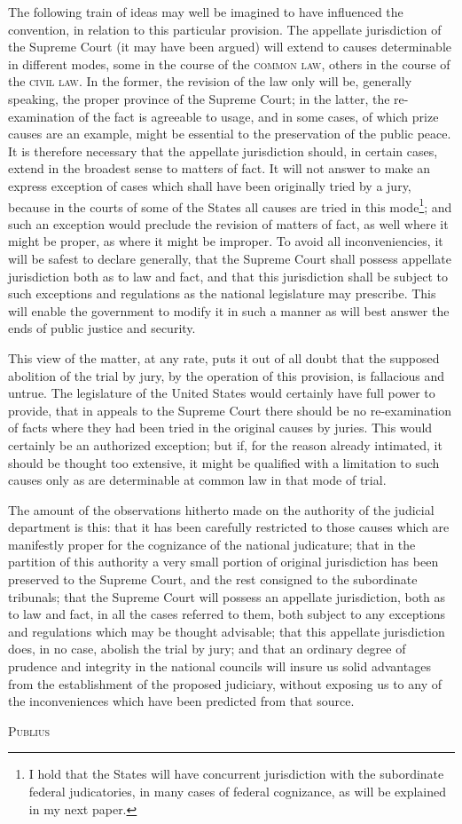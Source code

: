 The following train of ideas may well be imagined to have influenced the convention, in relation to this particular provision. The appellate jurisdiction of the Supreme Court (it may have been argued) will extend to causes determinable in different modes, some in the course of the \textsc{common law}, others in the course of the \textsc{civil law}. In the former, the revision of the law only will be, generally speaking, the proper province of the Supreme Court; in the latter, the re-examination of the fact is agreeable to usage, and in some cases, of which prize causes are an example, might be essential to the preservation of the public peace. It is therefore necessary that the appellate jurisdiction should, in certain cases, extend in the broadest sense to matters of fact. It will not answer to make an express exception of cases which shall have been originally tried by a jury, because in the courts of some of the States all causes are tried in this mode\footnote{I hold that the States will have concurrent jurisdiction with the subordinate federal judicatories, in many cases of federal cognizance, as will be explained in my next paper.}; and such an exception would preclude the revision of matters of fact, as well where it might be proper, as where it might be improper. To avoid all inconveniencies, it will be safest to declare generally, that the Supreme Court shall possess appellate jurisdiction both as to law and fact, and that this jurisdiction shall be subject to such exceptions and regulations as the national legislature may prescribe. This will enable the government to modify it in such a manner as will best answer the ends of public justice and security.

This view of the matter, at any rate, puts it out of all doubt that the supposed abolition of the trial by jury, by the operation of this provision, is fallacious and untrue. The legislature of the United States would certainly have full power to provide, that in appeals to the Supreme Court there should be no re-examination of facts where they had been tried in the original causes by juries. This would certainly be an authorized exception; but if, for the reason already intimated, it should be thought too extensive, it might be qualified with a limitation to such causes only as are determinable at common law in that mode of trial.

The amount of the observations hitherto made on the authority of the judicial department is this: that it has been carefully restricted to those causes which are manifestly proper for the cognizance of the national judicature; that in the partition of this authority a very small portion of original jurisdiction has been preserved to the Supreme Court, and the rest consigned to the subordinate tribunals; that the Supreme Court will possess an appellate jurisdiction, both as to law and fact, in all the cases referred to them, both subject to any exceptions and regulations which may be thought advisable; that this appellate jurisdiction does, in no case, abolish the trial by jury; and that an ordinary degree of prudence and integrity in the national councils will insure us solid advantages from the establishment of the proposed judiciary, without exposing us to any of the inconveniences which have been predicted from that source.

\vspace{.5cm}
\textsc{Publius}
